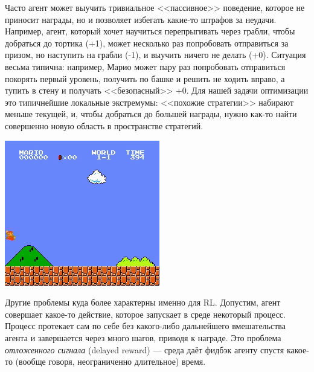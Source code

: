 \begin{exampleBox}[righthand ratio=0.25, sidebyside, sidebyside align=center, lower separated=false]{}
Часто агент может выучить тривиальное <<пассивное>> поведение, которое не приносит награды, но и позволяет избегать какие-то штрафов за неудачи. Например, агент, который хочет научиться перепрыгивать через грабли, чтобы добраться до тортика (+1), может несколько раз попробовать отправиться за призом, но наступить на грабли (-1), и выучить ничего не делать (+0). Ситуация весьма типична: например, Марио может пару раз попробовать отправиться покорять первый уровень, получить по башке и решить не ходить вправо, а тупить в стену и получать <<безопасный>> +0. Для нашей задачи оптимизации это типичнейшие локальные экстремумы: <<похожие стратегии>> набирают меньше текущей, и, чтобы добраться до большей награды, нужно как-то найти совершенно новую область в пространстве стратегий.

\tcblower
\includegraphics[width=\textwidth]{Images/MarioStupid.png}
\end{exampleBox}

Другие проблемы куда более характерны именно для RL. Допустим, агент совершает какое-то действие, которое запускает в среде некоторый процесс. Процесс протекает сам по себе без какого-либо дальнейшего вмешательства агента и завершается через много шагов, приводя к награде. Это проблема \emph{отложенного сигнала} (delayed reward) --- среда даёт фидбэк агенту спустя какое-то (вообще говоря, неограниченно длительное) время.


